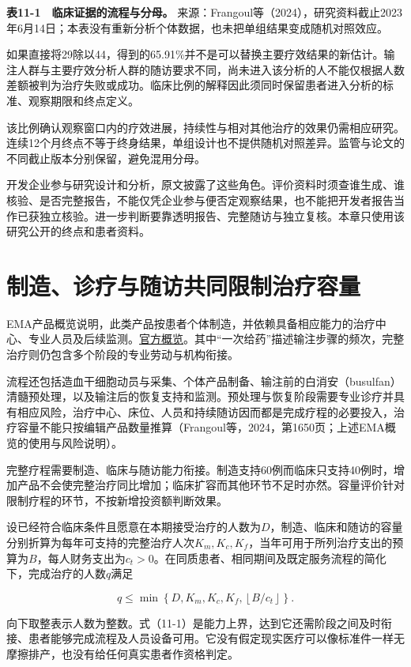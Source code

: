 \documentclass[UTF8,fontset=windows,12pt,a4paper,oneside,openany]{ctexbook}
\begin{document}
\textbf{表11-1　临床证据的流程与分母。} 来源：Frangoul等（2024），研究资料截止2023年6月14日；本表没有重新分析个体数据，也未把单组结果变成随机对照效应。

如果直接将29除以44，得到的65.91\%并不是可以替换主要疗效结果的新估计。输注人群与主要疗效分析人群的随访要求不同，尚未进入该分析的人不能仅根据人数差额被判为治疗失败或成功。临床比例的解释因此须同时保留患者进入分析的标准、观察期限和终点定义。

该比例确认观察窗口内的疗效进展，持续性与相对其他治疗的效果仍需相应研究。连续12个月终点不等于终身结果，单组设计也不提供随机对照差异。监管与论文的不同截止版本分别保留，避免混用分母。

开发企业参与研究设计和分析，原文披露了这些角色。评价资料时须查谁生成、谁核验、是否完整报告，不能仅凭企业参与便否定观察结果，也不能把开发者报告当作已获独立核验。进一步判断要靠透明报告、完整随访与独立复核。本章只使用该研究公开的终点和患者资料。

\section{制造、诊疗与随访共同限制治疗容量}

EMA产品概览说明，此类产品按患者个体制造，并依赖具备相应能力的治疗中心、专业人员及后续监测。\href{https://www.ema.europa.eu/en/medicines/human/EPAR/casgevy}{官方概览}。其中“一次给药”描述输注步骤的频次，完整治疗则仍包含多个阶段的专业劳动与机构衔接。

流程还包括造血干细胞动员与采集、个体产品制备、输注前的白消安（busulfan）清髓预处理，以及输注后的恢复支持和监测。预处理与恢复阶段需要专业诊疗并具有相应风险，治疗中心、床位、人员和持续随访因而都是完成疗程的必要投入，治疗容量不能只按编辑产品数量推算（Frangoul等，2024，第1650页；上述EMA概览的使用与风险说明）。

完整疗程需要制造、临床与随访能力衔接。制造支持60例而临床只支持40例时，增加产品不会使完整治疗同比增加；临床扩容而其他环节不足时亦然。容量评价针对限制疗程的环节，不按新增投资额判断效果。

设已经符合临床条件且愿意在本期接受治疗的人数为\(D\)，制造、临床和随访的容量分别折算为每年可支持的完整治疗人次\(K_m,K_c,K_f\)，当年可用于所列治疗支出的预算为\(B\)，每人财务支出为\(c_t>0\)。在同质患者、相同期间及既定服务流程的简化下，完成治疗的人数\(q\)满足

\[
q\leq \min\left\{D,K_m,K_c,K_f,\left\lfloor B/c_t\right\rfloor\right\}.
\tag{11-1}
\]

向下取整表示人数为整数。式（11-1）是能力上界，达到它还需阶段之间及时衔接、患者能够完成流程及人员设备可用。它没有假定现实医疗可以像标准件一样无摩擦排产，也没有给任何真实患者作资格判定。
\end{document}
